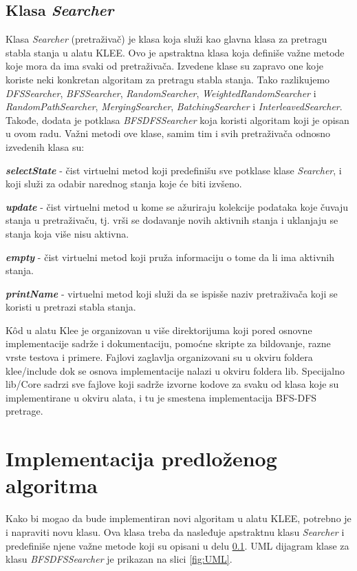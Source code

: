 \documentclass[12pt,oneside]{memoir}
\begin{document}
\subsection{Klasa \textit{Searcher}} \label{pretrazivac}
Klasa \textit{Searcher} (pretraživač) je klasa koja služi kao glavna klasa za pretragu stabla stanja u alatu KLEE. Ovo je apstraktna klasa koja definiše važne metode koje mora da ima svaki od pretraživača. Izvedene klase su zapravo one koje koriste neki konkretan algoritam za pretragu stabla stanja. Tako razlikujemo \textit{DFSSearcher}, \textit{BFSSearcher}, \textit{RandomSearcher}, \textit{WeightedRandomSearcher} i \textit{RandomPathSearcher}, \textit{MergingSearcher}, \textit{BatchingSearcher} i \textit{InterleavedSearcher}. Takođe, dodata je potklasa \textit{BFSDFSSearcher} koja koristi algoritam koji je opisan u ovom radu. Važni metodi ove klase, samim tim i svih pretraživača odnosno izvedenih klasa su:
\begin{description}
    \item \textbf{\textit{selectState}} - čist virtuelni metod koji predefinišu sve potklase klase \textit{Searcher}, i koji služi za odabir narednog stanja koje će biti izvšeno.
    
    \item \textbf{\textit{update}} - čist virtuelni metod u kome se ažuriraju kolekcije podataka koje čuvaju stanja u pretraživaču, tj. vrši se dodavanje novih aktivnih stanja i uklanjaju se stanja koja više nisu aktivna. 
    
    \item \textbf{\textit{empty}} - čist virtuelni metod koji pruža informaciju o tome da li ima aktivnih stanja.
    
    \item \textbf{\textit{printName}} - virtuelni metod koji služi da se ispisše naziv pretraživača koji se koristi u pretrazi stabla stanja.
\end{description}

K\^od u alatu Klee je organizovan u više direktorijuma koji pored osnovne implementacije sadrže i dokumentaciju, pomoćne skripte za bildovanje, razne vrste testova i primere. Fajlovi zaglavlja organizovani su u okviru foldera klee/include dok se osnova implementacije nalazi u okviru foldera lib. Specijalno lib/Core sadrzi sve fajlove koji sadrže izvorne kodove za svaku od klasa koje su implementirane u okviru alata, i tu je smestena implementacija BFS-DFS pretrage.

\section{Implementacija predloženog algoritma}
Kako bi mogao da bude implementiran novi algoritam u alatu KLEE, potrebno je i napraviti novu klasu. Ova klasa treba da nasleđuje apstraktnu klasu \textit{Searcher} i predefiniše njene važne metode koji su opisani u delu \ref{pretrazivac}. UML dijagram klase za klasu \textit{BFSDFSSearcher} je prikazan na slici \ref{fig:UML}.
\end{document}

